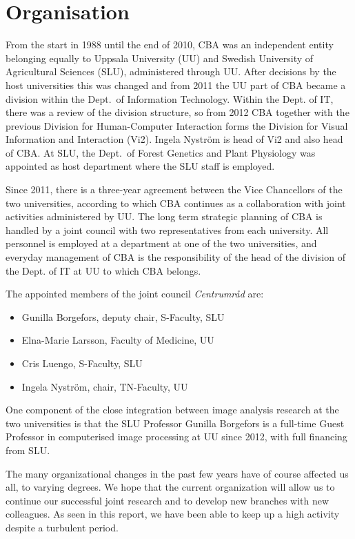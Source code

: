 \section{Organisation}\label{sec:organization}

\noindent 
From the start in 1988 until the end of 2010, CBA was an independent entity belonging equally to Uppsala University (UU) and Swedish University of Agricultural Sciences (SLU), administered through UU. After decisions by the host universities this was changed and from 2011 the UU part of CBA became a division within the Dept.\ of Information Technology. Within the Dept. of IT, there was a review of the division structure, so from 2012 CBA together with the previous Division for Human-Computer Interaction forms the Division for Visual Information and Interaction (Vi2). Ingela Nystr\"{o}m is head of Vi2 and also head of CBA. At SLU, the Dept.~of Forest Genetics and Plant Physiology was appointed as host department where the SLU staff is employed. 

Since 2011, there is a three-year agreement between the Vice Chancellors of the two universities, according to which CBA continues as a collaboration with joint activities administered by UU. The long term strategic planning of CBA is handled by a joint council with two representatives from each university. All personnel is employed at a department at one of the two universities, and everyday management of CBA is the responsibility of the head of the division of the Dept. of IT at UU to which CBA belongs. 

The appointed members of the joint council \emph{Centrumr{\aa}d} are:
\begin{itemize}
\item Gunilla Borgefors, deputy chair, S-Faculty, SLU
\item Elna-Marie Larsson, Faculty of Medicine, UU
\item Cris Luengo, S-Faculty, SLU
\item Ingela Nystr\"{o}m, chair, TN-Faculty, UU
\end{itemize}

One component of the close integration between image analysis research at the two universities is that the SLU Professor Gunilla Borgefors is a full-time Guest Professor in computerised image processing at UU since 2012, with full financing from SLU. 

The many organizational changes in the past few years have of course affected us all, to varying degrees. We hope that the current organization will allow us to continue our successful joint research and to develop new branches with new colleagues. As seen in this report, we have been able to keep up a high activity despite a turbulent period. 

